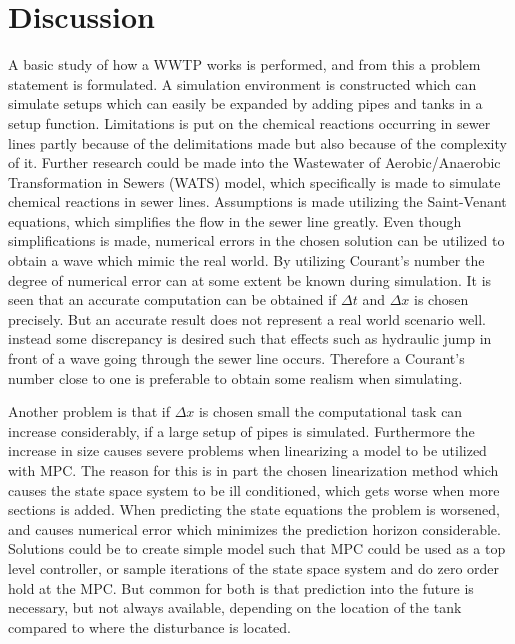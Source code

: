 \chapter{Discussion}\label{ch:discussion}
A basic study of how a WWTP works is performed, and from this a problem statement is formulated. A simulation environment is constructed which can simulate setups which can easily be expanded by adding pipes and tanks in a setup function. Limitations is put on the chemical reactions occurring in sewer lines partly because of the delimitations made but also because of the complexity of it. Further research could be made into the Wastewater of Aerobic/Anaerobic Transformation in Sewers (WATS) model, which specifically is made to simulate chemical reactions in sewer lines. Assumptions is made utilizing the Saint-Venant equations, which simplifies the flow in the sewer line greatly. Even though simplifications is made, numerical errors in the chosen solution can be utilized to obtain a wave which mimic the real world. By utilizing Courant's number the degree of numerical error can at some extent be known during simulation. It is seen that an accurate computation can be obtained if $\Delta t$ and $\Delta x$ is chosen precisely. But an accurate result does not represent a real world scenario well. instead some discrepancy is desired such that effects such as hydraulic jump in front of a wave going through the sewer line occurs.
Therefore a Courant's number close to one is preferable to obtain some realism when simulating. 

Another problem is that if $\Delta x$ is chosen small the computational task can increase considerably, if a large setup of pipes is simulated. Furthermore the increase in size causes severe problems when linearizing a model to be utilized with MPC. The reason for this is in part the chosen linearization method which causes the state space system to be ill conditioned, which gets worse when more sections is added. When predicting the state equations the problem is worsened, and causes numerical error which minimizes the prediction horizon considerable. Solutions could be to create simple model such that MPC could be used as a top level controller, or sample iterations of the state space system and do zero order hold at the MPC. But common for both is that prediction into the future is necessary, but not always available, depending on the location of the tank compared to where the disturbance is located.






